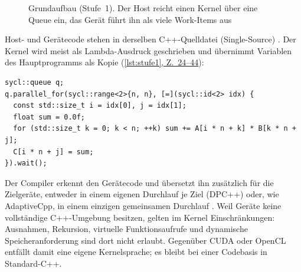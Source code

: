 \documentclass[12pt,a4paper]{article}
\newcommand{\stufenrahmen}[1][alt]{%
    \draw[#1] (0,0) rectangle (5.7,3.3);
    \node[anchor=north, titel, #1, draw=none] at (2.85,3.25) {Host (z.\,B.\ CPU)};
    \draw[#1] (7.2,0) rectangle (14.9,3.3);
    \node[anchor=north east, titel, #1, draw=none] at (14.8,3.25) {Gerät (z.\,B.\ GPU)};
    \node[kasten, #1, minimum width=5.1cm] (prog) at (2.85,2.45) {Hauptprogramm};
    \draw[->, #1] (prog.south) -- (2.85,1.75);
}
\newcommand{\workitems}[1]{%
    \foreach \g in {7.5,10.0} \foreach \i in {0,...,3} \foreach \j in {0,1}
        \draw[#1, fill=white] (\g+\i*0.45,2.0+\j*0.42) rectangle ++(0.36,0.32);
}
\newcommand{\stelle}[2]{(\hyperref[#1]{\ref*{#1}, Z.~#2})}
\begin{document}
\begin{figure}[htbp]
\centering
{}
\caption[Grundaufbau (Stufe~1)]{Grundaufbau (Stufe~1). Der Host reicht einen Kernel über eine Queue ein, das Gerät führt ihn als viele Work-Items aus}
\label{fig:stufe1}
\end{figure}

Host- und Gerätecode stehen in derselben C++-Quelldatei (Single-Source)
\cite{khronos2020sycl}. Der Kernel wird meist als Lambda-Ausdruck geschrieben
und übernimmt Variablen des Hauptprogramms als Kopie \stelle{lst:stufe1}{24--44}:

\begin{lstlisting}
sycl::queue q;
q.parallel_for(sycl::range<2>{n, n}, [=](sycl::id<2> idx) {
  const std::size_t i = idx[0], j = idx[1];
  float sum = 0.0f;
  for (std::size_t k = 0; k < n; ++k) sum += A[i * n + k] * B[k * n + j];
  C[i * n + j] = sum;
}).wait();
\end{lstlisting}

\noindent Der Compiler erkennt den Gerätecode und übersetzt ihn zusätzlich für
die Zielgeräte, entweder in einem eigenen Durchlauf je Ziel (DPC++) oder, wie
AdaptiveCpp, in einem einzigen gemeinsamen Durchlauf \cite{alpay2023sscp}. Weil
Geräte keine vollständige C++-Umgebung besitzen, gelten im Kernel
Einschränkungen: Ausnahmen, Rekursion, virtuelle Funktionsaufrufe und
dynamische Speicheranforderung sind dort nicht erlaubt. Gegenüber CUDA oder
OpenCL entfällt damit eine eigene Kernelsprache; es bleibt bei einer Codebasis
in Standard-C++.
\end{document}

